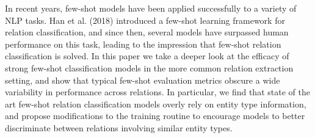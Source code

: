 In recent years, few-shot models have been applied successfully to a variety of NLP tasks. Han et al. (2018) introduced a few-shot learning framework for relation classification, and since then, several models have surpassed human performance on this task, leading to the impression that few-shot relation classification is solved. In this paper we take a deeper look at the efficacy of strong few-shot classification models in the more common relation extraction setting, and show that typical few-shot evaluation metrics obscure a wide variability in performance across relations. In particular, we find that state of the art few-shot relation classification models overly rely on entity type information, and propose modifications to the training routine to encourage models to better discriminate between relations involving similar entity types.
